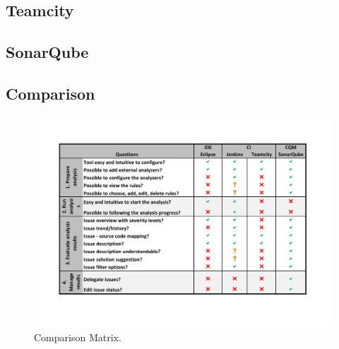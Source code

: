 \documentclass[conference]{IEEEtran}
\begin{document}
\subsection{Teamcity}
\label{subsec:evaluation_teamcity}

\subsection{SonarQube}
\label{subsec:evaluation_sonarqube}


\subsection{Comparison}
\label{subsec:comparation}

\begin{figure}[t]
	\includegraphics[width=\textwidth]{img/comparation}
	\caption{Comparison Matrix.}
	\label{fig:comparison_matrix}
\end{figure}


\end{document}
